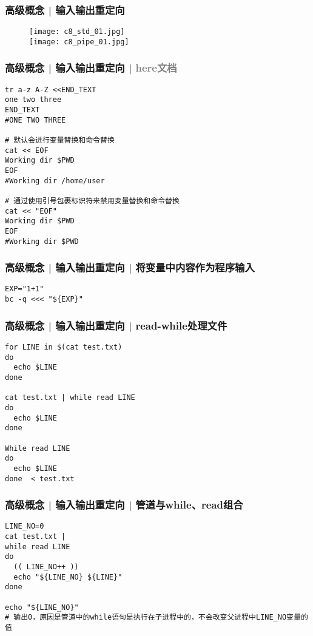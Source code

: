 \begin{frame}
  \frametitle{高级概念 | 输入输出重定向}
  \begin{figure}
    \centering
    \texttt{[image: c8\_std\_01.jpg]}\\
    \texttt{[image: c8\_pipe\_01.jpg]}
  \end{figure}
\end{frame}

\begin{frame}[fragile]
  \frametitle{高级概念 | 输入输出重定向 | \textcolor{gray}{here文档}}
\begin{lstlisting}
tr a-z A-Z <<END_TEXT
one two three
END_TEXT
#ONE TWO THREE

# 默认会进行变量替换和命令替换
cat << EOF
Working dir $PWD
EOF
#Working dir /home/user

# 通过使用引号包裹标识符来禁用变量替换和命令替换
cat << "EOF"
Working dir $PWD
EOF
#Working dir $PWD
\end{lstlisting}
\end{frame}

\begin{frame}[fragile]
  \frametitle{高级概念 | 输入输出重定向 | 将变量中内容作为程序输入}
\begin{lstlisting}
EXP="1+1"
bc -q <<< "${EXP}"
\end{lstlisting}
\end{frame}

\begin{frame}[fragile]
  \frametitle{高级概念 | 输入输出重定向 | read-while处理文件}
\begin{lstlisting}
for LINE in $(cat test.txt)
do
  echo $LINE
done

cat test.txt | while read LINE
do
  echo $LINE
done

While read LINE
do
  echo $LINE
done  < test.txt
\end{lstlisting}
\end{frame}

\begin{frame}[fragile]
  \frametitle{高级概念 | 输入输出重定向 | 管道与while、read组合}
\begin{lstlisting}
LINE_NO=0
cat test.txt |
while read LINE
do
  (( LINE_NO++ ))
  echo "${LINE_NO} ${LINE}"
done

echo "${LINE_NO}"
# 输出0，原因是管道中的while语句是执行在子进程中的，不会改变父进程中LINE_NO变量的值
\end{lstlisting}
\end{frame}

